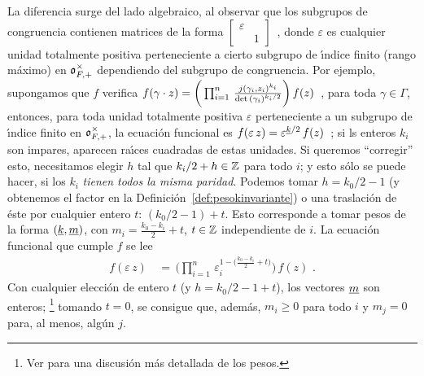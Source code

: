 \begin{obsEleccionDelFactor}
	La diferencia surge del lado algebraico, al observar que los subgrupos
	de congruencia contienen matrices de la forma
	\begin{math}
		\left[\begin{smallmatrix}
			\varepsilon & \\ & 1
		\end{smallmatrix}\right]
	\end{math}~, donde $\varepsilon$ es cualquier unidad totalmente
	positiva perteneciente a cierto subgrupo de \'{\i}ndice finito (rango
	m\'{a}ximo) en $\mathfrak{o}_{F,+}^{\times}$ dependiendo del subgrupo de
	congruencia. Por ejemplo, supongamos que $f$ verifica
	\begin{math}
		f(\gamma\cdot z)=\bigg(\prod_{i=1}^{n}\,
			\frac{j(\gamma_{i},z_{i})^{k_{i}}}{%
				\det(\gamma_{i})^{k_{i}/2}}\bigg)\,f(z)
	\end{math}~, para toda $\gamma\in\Gamma$, entonces, para toda unidad
	totalmente positiva $\varepsilon$ perteneciente a un subgrupo de
	\'{\i}ndice finito en $\mathfrak{o}_{F,+}^{\times}$, la ecuaci\'{o}n funcional
	es
	\begin{math}
		f(\varepsilon\,z)=\varepsilon^{\underline{k}/2}\,f(z)
	\end{math}~; si ls enteros $k_{i}$ son impares, aparecen ra\'{\i}ces
	cuadradas de estas unidades. Si queremos ``corregir'' esto, necesitamos
	elegir $h$ tal que $k_{i}/2 +h\in\mathbb{Z}$ para todo $i$; y esto s\'{o}lo
	se puede hacer, si los $k_{i}$ \emph{tienen todos la misma paridad}.
	Podemos tomar $h=k_{0}/2 -1$ (y obtenemos el factor en la
	Definici\'{o}n~\ref{def:pesokinvariante}) o una traslaci\'{o}n de
	\'{e}ste por cualquier entero $t$: $(k_{0}/2 - 1)+t$. Esto corresponde
	a tomar pesos de la forma $(\underline{k},\underline{m})$, con
	$m_{i}=\frac{k_{0}-k_{i}}{2}+t$, $t\in\mathbb{Z}$ independiente de $i$. La
	ecuaci\'{o}n funcional que cumple $f$ se lee
	\begin{align*}
		f(\varepsilon\,z) & \,=\,\bigg(\prod_{i=1}^{n}\,
			\varepsilon_{i}^{1-\big(\frac{k_{0}-k_{i}}{2}+t\big)}
			\bigg)\,f(z)
		\text{ .}
	\end{align*}
	Con cualquier elecci\'{o}n de entero $t$ (y $h=k_{0}/2 -1 +t$), los
	vectores $\underline{m}$ son enteros;%
	\footnote{
		Ver \cite{DembeleLoefflerPacettiNonparitious} para una
		discusi\'{o}n m\'{a}s detallada de los pesos.
	}
	tomando $t=0$, se consigue que, adem\'{a}s, $m_{i}\geq 0$ para todo
	$i$ y $m_{j}=0$ para, al menos, alg\'{u}n $j$.
\end{obsEleccionDelFactor}

